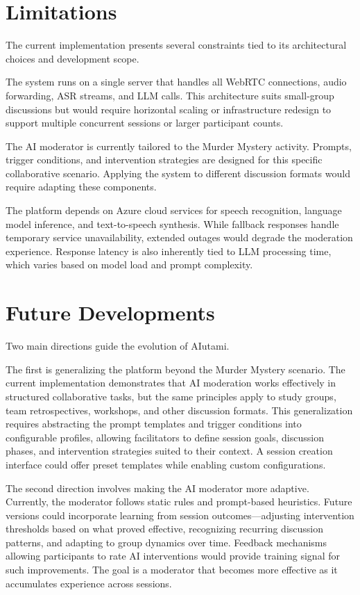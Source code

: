 \section{Limitations}

The current implementation presents several constraints tied to its architectural choices and development scope.

The system runs on a single server that handles all WebRTC connections, audio forwarding, ASR streams, and LLM calls. This architecture suits small-group discussions but would require horizontal scaling or infrastructure redesign to support multiple concurrent sessions or larger participant counts.

The AI moderator is currently tailored to the Murder Mystery activity. Prompts, trigger conditions, and intervention strategies are designed for this specific collaborative scenario. Applying the system to different discussion formats would require adapting these components.

The platform depends on Azure cloud services for speech recognition, language model inference, and text-to-speech synthesis. While fallback responses handle temporary service unavailability, extended outages would degrade the moderation experience. Response latency is also inherently tied to LLM processing time, which varies based on model load and prompt complexity.


\section{Future Developments}

Two main directions guide the evolution of AIutami.

The first is generalizing the platform beyond the Murder Mystery scenario. The current implementation demonstrates that AI moderation works effectively in structured collaborative tasks, but the same principles apply to study groups, team retrospectives, workshops, and other discussion formats. This generalization requires abstracting the prompt templates and trigger conditions into configurable profiles, allowing facilitators to define session goals, discussion phases, and intervention strategies suited to their context. A session creation interface could offer preset templates while enabling custom configurations.

The second direction involves making the AI moderator more adaptive. Currently, the moderator follows static rules and prompt-based heuristics. Future versions could incorporate learning from session outcomes---adjusting intervention thresholds based on what proved effective, recognizing recurring discussion patterns, and adapting to group dynamics over time. Feedback mechanisms allowing participants to rate AI interventions would provide training signal for such improvements. The goal is a moderator that becomes more effective as it accumulates experience across sessions.

